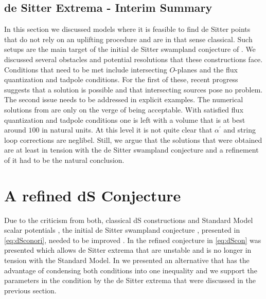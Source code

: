 \documentclass[a4paper,12pt,twoside,openright]{report}
\begin{document}
\subsection{de Sitter Extrema - Interim Summary}
In this section we discussed models where it is feasible to find de Sitter points that do not rely on an uplifting procedure and are in that sense classical. Such setups are the main target of the initial de Sitter swampland conjecture of \cite{Obied:2018sgi}. We discussed several obstacles and potential resolutions that these constructions face. Conditions that need to be met include intersecting $O$-planes and the flux quantization and tadpole conditions. For the first of these, recent progress \cite{Junghans:2020acz,Marchesano:2020qvg,Cribiori:2021djm} suggests that a solution is possible and that intersecting sources pose no problem. The second issue needs to be addressed in explicit examples. The numerical solutions from \cite{Danielsson:2012et,Roupec:2018mbn} are only on the verge of being acceptable. With satisfied flux quantization and tadpole conditions one is left with a volume that is at best around $100$ in natural units. At this level it is not quite clear that $\alpha^ \prime$ and string loop corrections are neglibel. Still, we argue that the solutions that were obtained are at least in tension with the de Sitter swampland conjecture and a refinement of it had to be the natural conclusion.

\section{A refined dS Conjecture}
\label{sec:refconj}
Due to the criticism from both, classical dS constructions \cite{Andriot:2018ept,Roupec:2018mbn} and Standard Model scalar potentials \cite{Denef:2018etk,Murayama:2018lie,Choi:2018rze,Hamaguchi:2018vtv}, the initial de Sitter swampland conjecture \cite{Obied:2018sgi}, presented in \eqref{eq:dSconori}, needed to be improved \cite{Andriot:2018wzk,Garg:2018reu}. In \cite{Ooguri:2018wrx} the refined conjecture in \eqref{eq:dScon} was presented which allows de Sitter extrema that are unstable and is no longer in tension with the Standard Model. In \cite{Andriot:2018mav} we presented an alternative that has the advantage of condensing both conditions into one inequality and we support the parameters in the condition by the de Sitter extrema that were discussed in the previous section.
\end{document}
